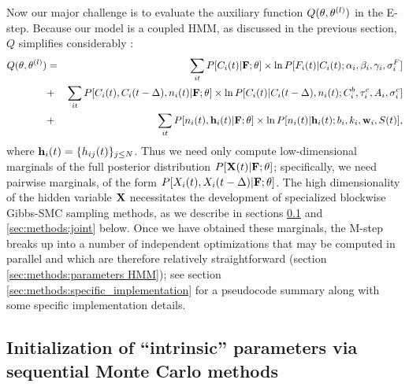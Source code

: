 Now our major challenge is to evaluate the auxiliary function
$Q(\mathbf{\theta},\mathbf{\theta}^{(l)})$ in the E-step. Because our model is a coupled
HMM, as discussed in the previous section, $Q$ simplifies considerably
\cite{RAB89}:
\begin{eqnarray}
  Q(\bth,\bth^{(l)}) &=& \sum_{it} P[C_i(t) | \bF; \bth] \times \ln
P[F_i(t)|C_i(t); \alpha_i, \beta_i, \gamma_i, \sigma^F_i] \nonumber \\
&+& \sum_{it} P[C_i(t), C_i(t-\Delta), n_i(t) | \bF; \bth] \times \ln
P[C_i(t)|C_i(t-\Delta), n_i(t); C^b_i, \tau^c_i, A_i, \sigma^c_i]
\nonumber \\ &+& \sum_{it} P[n_i(t), \bh_i(t) | \bF; \bth] \times \ln
P[n_i(t)| \bh_i(t); b_i, k_i, \bw_i, S(t)],
\label{eqn:loglik:definition-expl}
\end{eqnarray}
where $\mathbf{h}_i(t)=\{h_{ij}(t)\}_{j \leq N}$. Thus we need only compute
low-dimensional marginals of the full posterior distribution $P[{\bf X}(t)
| {\bf F}; \mathbf{\theta}]$; specifically, we need pairwise marginals, of the form
$P[X_i(t), X_i(t- \Delta) | {\bf F}; \mathbf{\theta}]$. The high dimensionality of
the hidden variable ${\bf X}$ necessitates the development of specialized
blockwise Gibbs-SMC sampling methods, as we describe in sections
\ref{sec:methods:indep} and \ref{sec:methods:joint} below. Once we
have obtained these marginals, the M-step breaks up into a number of
independent optimizations that may be computed in parallel and which
are therefore relatively straightforward (section
\ref{sec:methods:parameters HMM}); see section
\ref{sec:methods:specific_implementation} for a pseudocode summary
along with some specific implementation details.

\subsection{Initialization of ``intrinsic'' parameters via sequential
  Monte Carlo methods} \label{sec:methods:indep}

